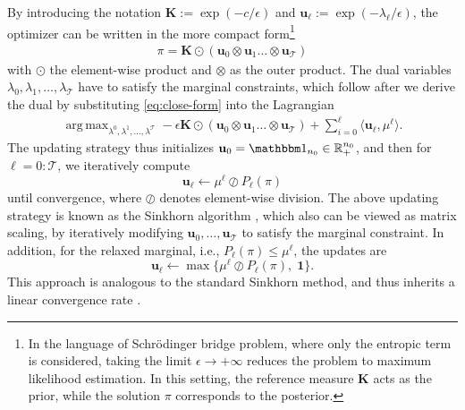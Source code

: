 \documentclass[11pt]{article}
\newcommand{\calT}{{\mathcal T}}
\newcommand{\bK}{{\mathbf K}}
\newcommand{\bu}{{\mathbf u}}
\newcommand{\ones}{{\mathbbm 1}}
\DeclareMathOperator*{\argmax}{arg\,max}
\begin{document}
By introducing the notation $\bK:=\exp(-c/\epsilon)$ and $\bu_\ell:= \exp(-\lambda_{\ell}/\epsilon)$, the optimizer can be written in the more compact form\footnote{In the language of Schr\"odinger bridge problem, where only the entropic term is considered, taking the limit $\epsilon \to +\infty$ reduces the problem to maximum likelihood estimation. In this setting, the reference measure $\bK$ acts as the prior, while the solution $\pi$ corresponds to the posterior.}
\begin{align}\label{eq:close-form}
\pi = \bK \odot \left(\bu_0 \otimes \bu_1 \dots \otimes \bu_\calT \right)
\end{align}
with $\odot$ the element-wise product and $\otimes$ as the outer product. The dual variables $\lambda_0,\lambda_1,\dots,\lambda_\calT$ have to satisfy the marginal constraints, which follow after we derive the dual by substituting \eqref{eq:close-form} into the Lagrangian
\begin{align*}%
\argmax_{\lambda^0,\lambda^1,\dots,\lambda^\calT} - \epsilon \bK \odot \left(\bu_0 \otimes \bu_1 \dots \otimes \bu_\calT \right) + \sum_{i=0}^{\ell} \langle \bu_\ell, \mu^\ell \rangle.
\end{align*}
The updating strategy thus initializes $\bu_0=\ones_{n_0}\in\mathbb{R}_+^{n_0}$, 
and then for $\ell=0:\calT$, we iteratively compute
\begin{equation}\label{eq:time-update}
\bu_\ell \longleftarrow \mu^\ell\oslash P_{\ell}(\pi)
\end{equation}
until convergence, where $\oslash$ denotes element-wise division. The above updating strategy is known as the Sinkhorn algorithm \cite{dong2025data,peyre2019computational,sinkhorn1964relationship}, which also can be viewed as matrix scaling, by iteratively modifying $\bu_0,\dots,\bu_\calT$ to satisfy the marginal constraint. In addition, for the relaxed marginal, i.e., $P_\ell(\pi) \leq \mu^\ell$, the updates are 
$$
\bu_\ell \longleftarrow \max \Big\{ \mu^\ell\oslash P_{\ell}(\pi),\; \mathbf 1\Big\}.
$$
This approach is analogous to the standard Sinkhorn method, and thus inherits a linear convergence rate \cite{haasler2021multi}.
\end{document}
